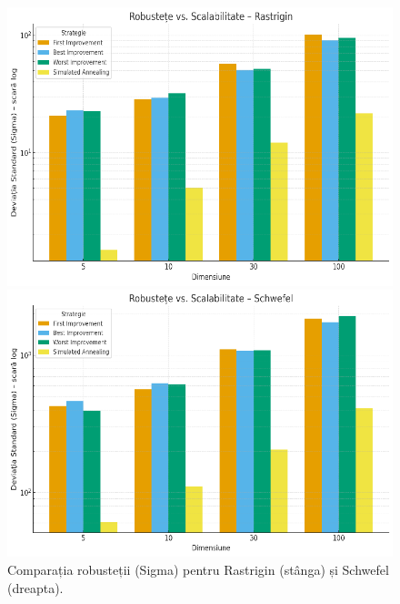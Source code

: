 \documentclass[
]{article}
\begin{document}
\begin{figure}[htbp]
	\centering
	
	\begin{minipage}{0.48\textwidth}
		\centering
		\includegraphics[width=\textwidth]{vertopal_3cc9e404d6084a9aa4179e4b559e5481/media/image8.png}
	\end{minipage}
	\hfill %
	\begin{minipage}{0.48\textwidth}
		\centering
		\includegraphics[width=\textwidth]{vertopal_3cc9e404d6084a9aa4179e4b559e5481/media/image9.png}
	\end{minipage}
	
	\caption{Comparația robusteții (Sigma) pentru Rastrigin (stânga) și Schwefel (dreapta).}
	\label{fig:robustete-rastrigin-schwefel}
\end{figure}
\end{document}
